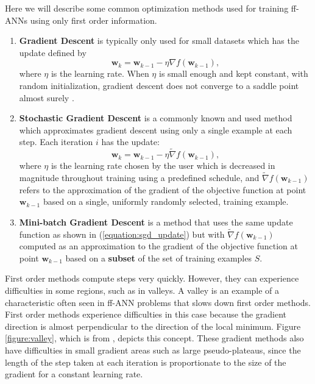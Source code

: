 \documentclass[letterpaper,12pt,titlepage,oneside,final]{book}
\begin{document}
	Here we will describe some common optimization methods used for training ff-ANNs using only first order information. 
	\begin{enumerate}
		\item {\textbf{Gradient Descent} is typically only used for small datasets which has the update defined by 
			\begin{equation}
			\mathbf{w}_{k} = \mathbf{w}_{k-1} - \eta{\nabla}{f(\mathbf{w}_{k-1})},
			\label{equation:gd_update}
			\end{equation}
			where $\eta$ is the learning rate. When $\eta$ is small enough and kept constant, with random initialization, gradient descent does not converge to a saddle point almost surely \cite{gd_converges.paper}.
		}
		\item{\textbf{Stochastic Gradient Descent} is a commonly known and used method which approximates gradient descent using only a single example at each step. Each iteration $i$ has the update:
			\begin{equation}
			\mathbf{w}_{k} = \mathbf{w}_{k-1} - \eta\widetilde{\nabla}{f(\mathbf{w}_{k-1})},
			\label{equation:sgd_update}
			\end{equation}
			where $\eta$ is the learning rate chosen by the user which is decreased in magnitude throughout training using a predefined schedule, and $\widetilde{\nabla}{f(\mathbf{w}_{k-1})}$ refers to the approximation of the gradient of the objective function at point $\mathbf{w}_{k-1}$ based on a single, uniformly randomly selected, training example. 
		}   
		\item{\textbf{Mini-batch Gradient Descent} is a method that uses the same update function as shown in (\ref{equation:sgd_update}) but with $\widetilde{\nabla}{f(\mathbf{w}_{k-1})}$ computed as an approximation to the gradient of the objective function at point $\mathbf{w}_{k-1}$ based on a \textbf{subset} of the set of training examples $S$.}
	\end{enumerate}
	First order methods compute steps very quickly. However, they can experience difficulties in some regions, such as in valleys. A valley is an example of a characteristic often seen in ff-ANN problems \cite{Shepherd.1997} that slows down first order methods. First order methods experience difficulties in this case because the gradient direction is almost perpendicular to the direction of the local minimum. Figure \ref{figure:valley}, which is from \cite{martens2010deep}, depicts this concept. These gradient methods also have difficulties in small gradient areas such as large pseudo-plateaus, since the length of the step taken at each iteration is proportionate to the size of the gradient for a constant learning rate.
	
\end{document}
